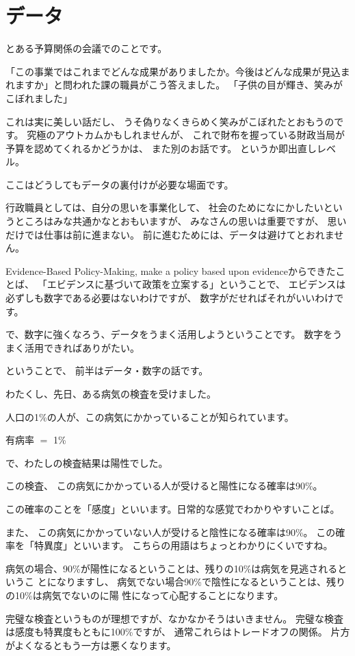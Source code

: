 \documentclass[uplatex,jis2004,dvipdfmx,12pt]{jsarticle}
\begin{document}
\section{データ}
とある予算関係の会議でのことです。

「この事業ではこれまでどんな成果がありましたか。今後はどんな成果が見込ま
れますか」と問われた課の職員がこう答えました。
「子供の目が輝き、笑みがこぼれました」

これは実に美しい話だし、
うそ偽りなくきらめく笑みがこぼれたとおもうのです。
究極のアウトカムかもしれませんが、
これで財布を握っている財政当局が予算を認めてくれるかどうかは、
また別のお話です。
というか即出直しレベル。

ここはどうしてもデータの裏付けが必要な場面です。



行政職員としては、自分の思いを事業化して、
社会のためになにかしたいというところはみな共通かなとおもいますが、
みなさんの思いは重要ですが、
思いだけでは仕事は前に進まない。
前に進むためには、データは避けてとおれません。

Evidence-Based Policy-Making,
make a policy based upon evidenceからできたことば、
「エビデンスに基づいて政策を立案する」ということで、
エビデンスは必ずしも数字である必要はないわけですが、
数字がだせればそれがいいわけです。

で、数字に強くなろう、データをうまく活用しようということです。
数字をうまく活用できればありがたい。

ということで、
前半はデータ・数字の話です。


わたくし、先日、ある病気の検査を受けました。

人口の1\%の人が、この病気にかかっていることが知られています。

有病率 $=$ 1\%

で、わたしの検査結果は陽性でした。

この検査、
この病気にかかっている人が受けると陽性になる確率は90\%。

この確率のことを「感度」といいます。日常的な感覚でわかりやすいことば。

また、
この病気にかかっていない人が受けると陰性になる確率は90\%。
この確率を「特異度」といいます。
こちらの用語はちょっとわかりにくいですね。

病気の場合、90\%が陽性になるということは、残りの10\%は病気を見逃されるというこ
とになりますし、
病気でない場合90\%で陰性になるということは、残りの10\%は病気でないのに陽
性になって心配することになります。

完璧な検査というものが理想ですが、なかなかそうはいきません。
完璧な検査は感度も特異度もともに100\%ですが、
通常これらはトレードオフの関係。
片方がよくなるともう一方は悪くなります。
\end{document}
